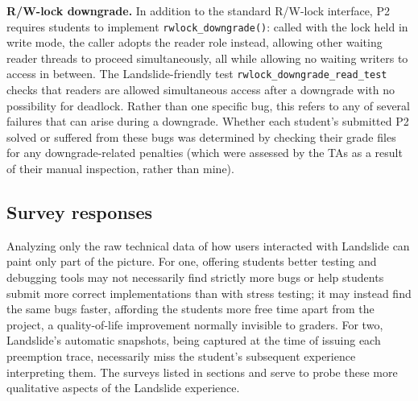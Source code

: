 {\bf R/W-lock downgrade.}
In addition to the standard R/W-lock interface,
P2 requires students to implement {\tt rwlock\_downgrade()}:
called with the lock held in write mode,
the caller adopts the reader role instead,
allowing other waiting reader threads to proceed simultaneously,
all while allowing no waiting writers to access in between.
%
The Landslide-friendly test {\tt rwlock\_downgrade\_read\_test}
checks that readers are allowed simultaneous access after a downgrade with no possibility for deadlock.
Rather than one specific bug, this refers to any of several failures that can arise during a downgrade.
Whether each student's submitted P2 solved or suffered from these bugs
was determined by checking their grade files for any downgrade-related penalties
(which were assessed by the TAs as a result of their manual inspection, rather than mine).

\subsection{Survey responses}

Analyzing only the raw technical data of how users interacted with Landslide can paint only part of the picture.
For one, offering students better testing and debugging tools
may not necessarily find strictly more bugs or help students submit more correct implementations
than with stress testing;
it may instead find the same bugs faster,
affording the students more free time apart from the project,
a quality-of-life improvement normally invisible to graders.
For two, Landslide's automatic snapshots, being captured at the time of issuing each preemption trace,
necessarily miss the student's subsequent experience interpreting them.
The surveys listed in sections \sect{\ref{sec:education-survey-pebbles}} and \sect{\ref{sec:education-survey-pintos}}
serve to probe these more qualitative aspects of the Landslide experience.

